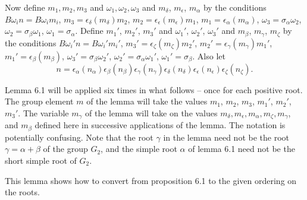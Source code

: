 \documentclass{memo-l}
\theoremstyle{definition}
\theoremstyle{remark}
\numberwithin{section}{chapter}
\numberwithin{equation}{chapter}
\begin{document}
Now define $m_{1}, m_{2}, m_{3}$ and ${\omega}_{1}, {\omega}_{2}, 
{\omega}_{3}$ and $m_{{\delta}}$, $m_{{\epsilon}}$, $m_{{\alpha}}$ by the 
conditions $B{\omega}_{i}n = B{\omega}_{i}m_{i}$, 
$m_{3} = 
{\epsilon}_{{\delta}}(m_{{\delta}})m_{2}$, $m_{2} = 
{\epsilon}_{{\epsilon}}(m_{{\epsilon}})m_{1}$, 
$m_{1} = 
{\epsilon}_{{\alpha}}(m_{{\alpha}})$, 
${\omega}_{3} = 
{\sigma}_{{\alpha}}{\omega}_{2}$, 
${\omega}_{2} = 
{\sigma}_{{\beta}}{\omega}_{1}$, 
${\omega}_{1} = {\sigma}_{{\alpha}}$. 
 Define $m_{1}'$, $m_{2}'$, $m_{3}'$ and ${\omega}_{1}'$, ${\omega}_{2}'$, 
${\omega}_{3}'$ and $m_{{\beta}}$, $m_{{\gamma}}$, $m_{{\zeta}}$ by the 
conditions $B{\omega}_{i}'n=B{\omega}_{i}'m_{i}'$, 
$m_{3}' = 
{\epsilon}_{{\zeta}}(m_{{\zeta}})m_{2}'$, $m_{2}' = 
{\epsilon}_{{\gamma}}(m_{{\gamma}})m_{1}'$, 
$m_{1}' = 
{\epsilon}_{{\beta}}(m_{{\beta}})$, 
${\omega}_{3}' = 
{\sigma}_{{\beta}}{\omega}_{2}'$, ${\omega}_{2}' = 
{\sigma}_{{\alpha}}{\omega}_{1}'$, ${\omega}_{1}' = {\sigma}_{{\beta}}$. 
 Also let $$n = {\epsilon}_{{\alpha}}(n_{{\alpha}}){\epsilon}_{{\beta}}
(n_{{\beta}}){\epsilon}_{{\gamma}}(n_{{\gamma}}){\epsilon}_{{\delta}}
(n_{{\delta}}){\epsilon}_{{\epsilon}}(n_{{\epsilon}}){\epsilon}_{{\zeta}}
(n_{{\zeta}}).$$ 
 

   Lemma 6.1 will be applied six times in what follows -- once for 
each positive root. 
 The group element $m$ of the lemma will take the values $m_{1}$, $m_{2}$, $m_{3}$, 
$m_{1}'$, $m_{2}'$, $m_{3}'$. 
 The variable $m_{{\gamma}}$ of the lemma will take on the values 
$m_{{\delta}}, m_{{\epsilon}}, m_{{\alpha}}, m_{{\zeta}}, m_{{\gamma}}$, 
and $m_{{\beta}}$ defined here in successive applications of the lemma. 
 The notation is potentially confusing. 
 Note that the root ${\gamma}$ in the lemma need not be the root ${\gamma} 
= {\alpha}+{\beta}$ of the group $G_{2}$, and the simple root ${\alpha}$ of 
lemma 6.1 need not be the short simple root of $G_{2}$. 
 

This lemma shows how to convert from proposition 6.1 to the given ordering 
on the roots.
\end{document}
